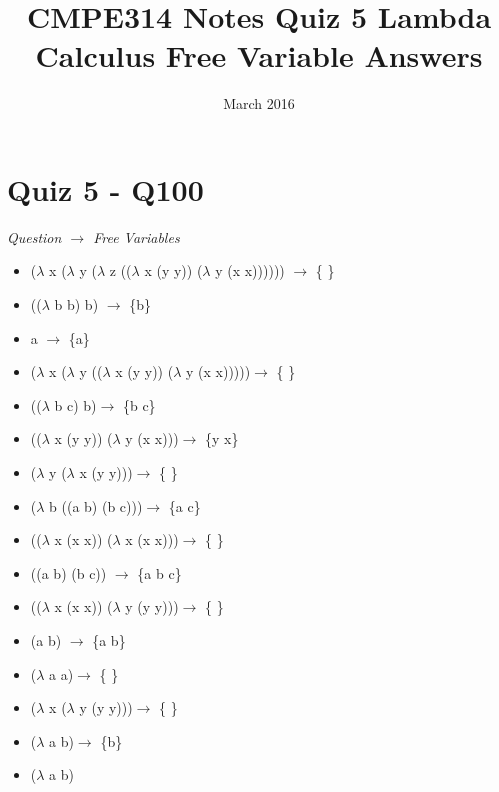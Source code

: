 \documentclass{article}
\title{CMPE314 Notes Quiz 5 Lambda Calculus Free Variable Answers}
\date{March 2016}
\begin{document}
\maketitle

\section{Quiz 5 - Q100}
\textit{Question $\rightarrow$ Free Variables}

 \begin{itemize}
	\item ($\lambda$ x ($\lambda$ y ($\lambda$ z (($\lambda$ x (y y)) ($\lambda$ y (x x)))))) $\rightarrow$ \{ \}
	\item (($\lambda$ b b) b) $\rightarrow$ \{b\}
	\item a $\rightarrow$ \{a\}
	\item ($\lambda$ x ($\lambda$ y (($\lambda$ x (y y)) ($\lambda$ y (x x)))))$\rightarrow$ \{ \}
	\item (($\lambda$ b c) b)$\rightarrow$ \{b c\}
	\item (($\lambda$ x (y y)) ($\lambda$ y (x x)))$\rightarrow$ \{y x\}
	\item ($\lambda$ y ($\lambda$ x (y y)))$\rightarrow$ \{ \}
	\item ($\lambda$ b ((a b) (b c)))$\rightarrow$ \{a c\}
	\item (($\lambda$ x (x x)) ($\lambda$ x (x x)))$\rightarrow$ \{ \}
	\item ((a b) (b c)) $\rightarrow$ \{a b c\}
	\item (($\lambda$ x (x x)) ($\lambda$ y (y y)))$\rightarrow$ \{ \}
	\item (a b) $\rightarrow$ \{a b\}
	\item ($\lambda$ a a)$\rightarrow$ \{ \}
	\item ($\lambda$ x ($\lambda$ y (y y)))$\rightarrow$ \{ \}
	\item ($\lambda$ a b)$\rightarrow$ \{b\}
	\item ($\lambda$  a b)
 \end{itemize}
 
 
\end{document}
